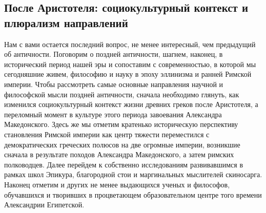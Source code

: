 \subsection{После Аристотеля: социокультурный контекст и плюрализм направлений}
Нам с вами
остается последний вопрос, не менее интересный, чем предыдущий об античности.
Поговорим о поздней античности, шагнем, наконец, в исторический период нашей эры
и сопоставим с современностью, в которой мы сегодняшние живем, философию и науку
в эпоху эллинизма и ранней Римской империи. Чтобы рассмотреть самые основные
направления научной и философской мысли поздней античности, сначала необходимо
глянуть, как изменился социокультурный контекст жизни древних греков после
Аристотеля, а переломный момент в культуре этого периода завоевания Александра
Македонского. Здесь же мы отметим кратенько историческую перспективу становления
Римской империи как центр тяжести переместился с демократических греческих
полюсов на две огромные империи, возникшие сначала в результате походов
Александра Македонского, а затем римских полководцев. Далее перейдем к
собственно исследованиям развивавшимся в рамках школ Эпикура, благородной стои и
маргинальных мыслителей скиносарга. Наконец отметим и других не менее выдающихся
ученых и философов, обучавшихся и творивших в процветающем образовательном
центре того времени Александрии Египетской. 

